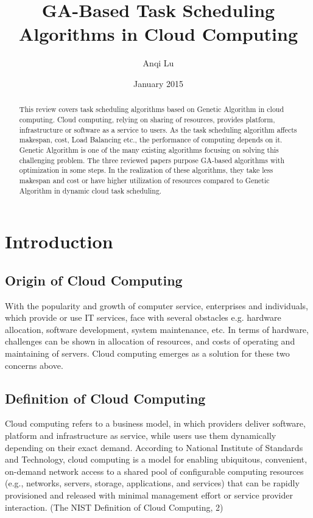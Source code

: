 \documentclass[10pt,twoside,openright,logo]{report}
\title{GA-Based Task Scheduling Algorithms in Cloud Computing}
\author{Anqi Lu}
\date{January 2015}
\begin{document}
\maketitle

\begin{abstract}
\noindent This review covers task scheduling algorithms based on Genetic Algorithm in cloud computing. Cloud computing, relying on sharing of resources, provides platform, infrastructure or software as a service to users. As the task scheduling algorithm affects makespan, cost, Load Balancing etc., the performance of computing depends on it. Genetic Algorithm is one of the many existing algorithms focusing on solving this challenging problem. The three reviewed papers purpose GA-based algorithms with optimization in some steps. In the realization of these algorithms, they take less makespan and cost or have higher utilization of resources compared to Genetic Algorithm in dynamic cloud task scheduling.
\end{abstract}

\tableofcontents

\chapter{Introduction}
\section{Origin of Cloud Computing}
With the popularity and growth of computer service, enterprises and individuals, which provide or use IT services, face with several obstacles e.g. hardware allocation, software development, system maintenance, etc. In terms of hardware, challenges can be shown in allocation of resources, and costs of operating and maintaining of servers. Cloud computing emerges as a solution for these two concerns above.

\section{Definition of Cloud Computing}
Cloud computing refers to a business model, in which providers deliver software, platform and infrastructure as service, while users use them dynamically depending on their exact demand. According to National Institute of Standards and Technology, cloud computing is a model for enabling ubiquitous, convenient, on-demand network access to a shared pool of configurable computing resources (e.g., networks, servers, storage, applications, and services) that can be rapidly provisioned and released with minimal management effort or service provider interaction.  (The NIST Definition of Cloud Computing, 2)
\end{document}
